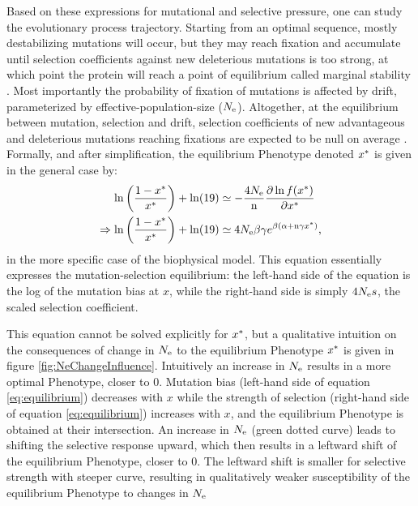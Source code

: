 Based on these expressions for mutational and selective pressure, one can study the evolutionary process trajectory.
Starting from an optimal sequence, mostly destabilizing mutations will occur, but they may reach fixation and accumulate until selection coefficients against new deleterious mutations is too strong, at which point the protein will reach a point of equilibrium called marginal stability \citep{Taverna2002, Bloom2007}.
Most importantly the probability of fixation of mutations is affected by \gls{drift}, parameterized by \gls{effective-population-size} ($N_{\mathrm{e}}$).
Altogether, at the equilibrium between mutation, selection and drift, selection coefficients of new advantageous and deleterious mutations reaching fixations are expected to be null on average \citep{Goldstein2013}.
Formally, and after simplification, the equilibrium \gls{Phenotype} denoted $x^{*}$ is given in the general case by:
\begin{align}
 \ln \left( \frac{1 - x\eq}{x\eq} \right) + \ln (19) & \simeq - \frac{4\Ne}{\Nsite} \frac{ \partial \ln f(x\eq) }{\partial {x\eq}} \\
 \Rightarrow \ln \left( \frac{1 - x\eq}{x\eq} \right) + \ln (19) & \simeq 4\Ne \beta \gamma e^{\beta (\DeltaGmin + \Nsite \gamma x\eq)} \text{,} \label{eq:equilibrium}
\end{align}
in the more specific case of the biophysical model. This equation essentially expresses the mutation-selection equilibrium: the left-hand side of the equation is the log of the mutation bias at $x$, while the right-hand side is simply $4 N_{\mathrm{e}} s$, the scaled selection coefficient.

This equation cannot be solved explicitly for $x^{*}$, but a qualitative intuition on the consequences of change in $N_{\mathrm{e}}$ to the equilibrium \gls{Phenotype} $x^{*}$ is given in figure \ref{fig:NeChangeInfluence}.
Intuitively an increase in $N_{\mathrm{e}}$ results in a more optimal \gls{Phenotype}, closer to $0$.
Mutation bias (left-hand side of equation \ref{eq:equilibrium}) decreases with $x$ while the strength of selection (right-hand side of equation \ref{eq:equilibrium}) increases with $x$, and the equilibrium \gls{Phenotype} is obtained at their intersection.
An increase in $N_{\mathrm{e}}$ (green dotted curve) leads to shifting the selective response upward, which then results in a leftward shift of the equilibrium \gls{Phenotype}, closer to $0$.
The leftward shift is smaller for selective strength with steeper curve, resulting in qualitatively weaker susceptibility of the equilibrium \gls{Phenotype} to changes in $N_{\mathrm{e}}$

